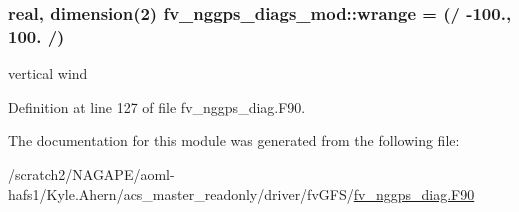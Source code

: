 \subsubsection[{wrange}]{\setlength{\rightskip}{0pt plus 5cm}real, dimension(2) fv\-\_\-nggps\-\_\-diags\-\_\-mod\-::wrange = (/ -\/100., 100. /)\hspace{0.3cm}{\ttfamily [private]}}\label{classfv__nggps__diags__mod_ac62774517426ba9abf37f95e33a53c75}


vertical wind 



Definition at line 127 of file fv\-\_\-nggps\-\_\-diag.\-F90.



The documentation for this module was generated from the following file\-:\begin{DoxyCompactItemize}
\item 
/scratch2/\-N\-A\-G\-A\-P\-E/aoml-\/hafs1/\-Kyle.\-Ahern/acs\-\_\-master\-\_\-readonly/driver/fv\-G\-F\-S/\hyperlink{fv__nggps__diag_8F90}{fv\-\_\-nggps\-\_\-diag.\-F90}\end{DoxyCompactItemize}
